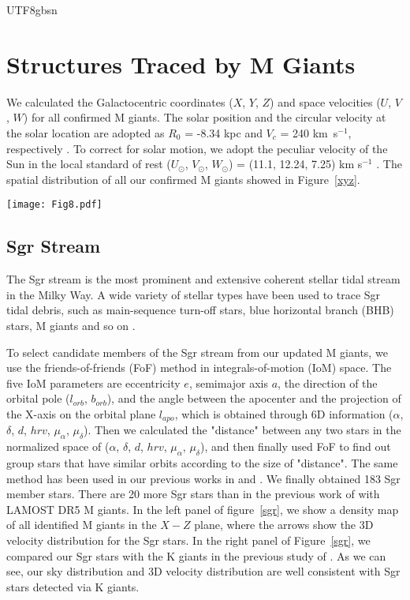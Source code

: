 \documentclass[manuscript]{aastex62}
\begin{document}
\begin{CJK*}{UTF8}{gbsn}
\section{Structures Traced by M Giants}
We calculated the Galactocentric coordinates ($X$, $Y$, $Z$) and space velocities ($U$, $V$, $W$) for all confirmed M giants. The solar position and the circular velocity at the solar location are adopted as $R_0$ = -8.34 kpc and $V_c$ = 240 km~s$^{-1}$, respectively \citep{2014ApJ...783..130R}. To correct for solar motion, we adopt the peculiar velocity of the Sun in the local standard of rest ($U_\odot$, $V_\odot$, $W_\odot$) = (11.1, 12.24, 7.25) km s$^{-1}$ \citep{2010MNRAS.403.1829S}. The spatial distribution of all our confirmed M giants showed in Figure~\ref{xyz}. 
\begin{figure*}
   \centering
   \texttt{[image: Fig8.pdf]}
   \caption{Galactocentric spatial distribution of the confirmed M giants in LAMOST DR9.}
   \label{xyz}
\end{figure*}   

\subsection{Sgr Stream}
The Sgr stream is the most prominent and extensive coherent stellar tidal stream in the Milky Way. A wide variety of stellar types have been used to trace Sgr tidal debris, such as main-sequence turn-off stars, blue horizontal branch (BHB) stars, M giants and so on \citep{2003ApJ...599.1082M,2019ApJ...874..138L,2019ApJ...886..154Y}. 

To select candidate members of the Sgr stream from our updated M giants, we use the friends-of-friends (FoF) method in integrals-of-motion (IoM) space. The five IoM parameters are eccentricity $e$, semimajor axis $a$, the direction of the orbital pole ($l_{orb}$, $b_{orb}$), and the angle between the apocenter and the projection of the X-axis on the orbital plane $l_{apo}$, which is obtained through 6D information ($\alpha$, $\delta$, $d$, $hrv$, $\mu_{\alpha}$, $\mu_{\delta}$). Then we calculated the "distance" between any two stars in the normalized space of ($\alpha$, $\delta$, $d$, $hrv$, $\mu_{\alpha}$, $\mu_{\delta}$), and then finally used FoF to find out group stars that have similar orbits according to the size of "distance". The same method has been used in our previous works in \citet{2019ApJ...886..154Y} and \citet{2021ApJ...910...46L}. We finally obtained 183 Sgr member stars. There are 20 more Sgr stars than in the previous work of \citet{2019ApJ...874..138L} with LAMOST DR5 M giants. In the left panel of figure~\ref{sgr}, we show a density map of all identified M giants in the $X-Z$ plane, where the arrows show the 3D velocity distribution for the Sgr stars. In the right panel of Figure~\ref{sgr}, we compared our Sgr stars with the K giants in the previous study of \citet{2019ApJ...886..154Y}. As we can see, our sky distribution and 3D velocity distribution are well consistent with Sgr stars detected via K giants.


\end{CJK*}
\end{document}
